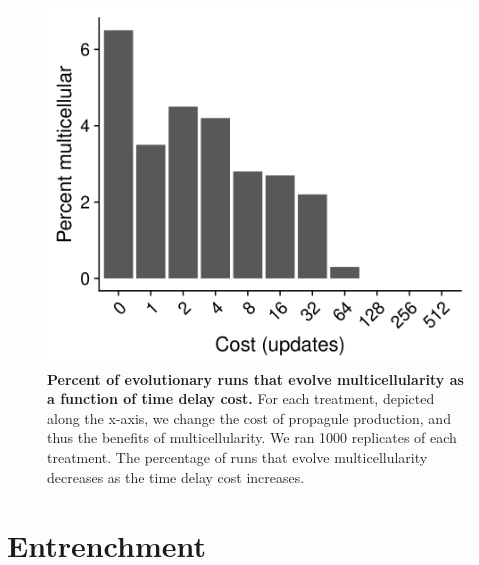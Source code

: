 \documentclass[
]{book}
\begin{document}
\begin{figure}
\centering
\includegraphics{images/Percent_multi_by_cost.png}
\caption{\label{fig:multi-cost}\textbf{Percent of evolutionary runs that evolve multicellularity as a function of time delay cost.} For each treatment, depicted along the x-axis, we change the cost of propagule production, and thus the benefits of multicellularity. We ran 1000 replicates of each treatment. The percentage of runs that evolve multicellularity decreases as the time delay cost increases.}
\end{figure}

\hypertarget{entrenchment}{%
\section{Entrenchment}\label{entrenchment}}
\end{document}
